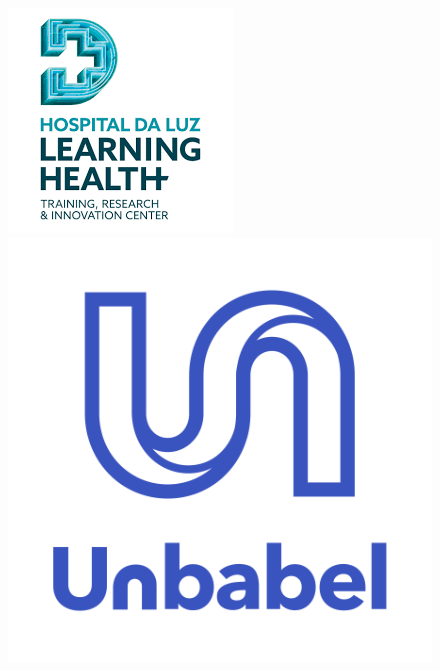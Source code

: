 \begin{figure}[ht]
        \hfill
        \begin{minipage}[b]{0.06\linewidth}
            \includegraphics[width=\linewidth]{images/hluz.png}
        \end{minipage}
        \hfill
        \begin{minipage}[b]{0.06\linewidth}
            \includegraphics[width=\linewidth]{images/unbabel.png}
        \end{minipage}
    \end{figure}
     
